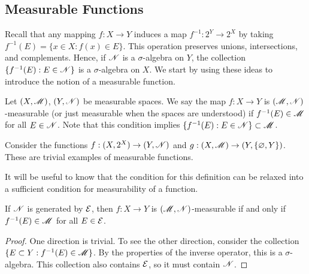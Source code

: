 \documentclass[12pt]{article} %
\begin{document}
\subsection{Measurable Functions}
Recall that any mapping $f : X \to Y$ induces a map $f^{-1} : 2^Y \to 2^X$ by taking $f^{-1}(E) = \{x \in X : f(x) \in E\}$. This operation preserves unions, intersections, and complements. Hence, if $\mathscr{N}$ is a $\sigma$-algebra on $Y$, the collection $\{f^{-1}(E) : E \in \mathscr{N}\}$ is a $\sigma$-algebra on $X$. We start by using these ideas to introduce the notion of a measurable function.

\begin{definition}
    Let $(X, \mathscr{M})$, $(Y, \mathscr{N})$ be measurable spaces. We say the map $f : X \to Y$ is $(\mathscr{M}, \mathscr{N})$-measurable (or just measurable when the spaces are understood) if $f^{-1}(E) \in \mathscr{M}$ for all $E \in \mathscr{N}$. Note that this condition implies $\{f^{-1}(E) : E \in \mathscr{N}\} \subset \mathscr{M}$.
\end{definition}

\begin{example}
    Consider the functions $f : (X, 2^X) \to (Y, \mathscr{N})$ and $g : (X, \mathscr{M}) \to (Y, \{\varnothing, Y\})$. These are trivial examples of measurable functions.
\end{example}

\noindent It will be useful to know that the condition for this definition can be relaxed into a sufficient condition for measurability of a function.

\begin{proposition}
    If $\mathscr{N}$ is generated by $\mathcal{E}$, then $f : X \to Y$ is $(\mathscr{M}, \mathscr{N})$-measurable if and only if $f^{-1}(E) \in \mathscr{M}$ for all $E \in \mathcal{E}$.
\end{proposition}

\begin{proof}
    One direction is trivial. To see the other direction, consider the collection $\{E \subset Y : f^{-1}(E) \in \mathscr{M}\}$. By the properties of the inverse operator, this is a $\sigma$-algebra. This collection also contains $\mathcal{E}$, so it must contain $\mathscr{N}$.
\end{proof}
\end{document}
